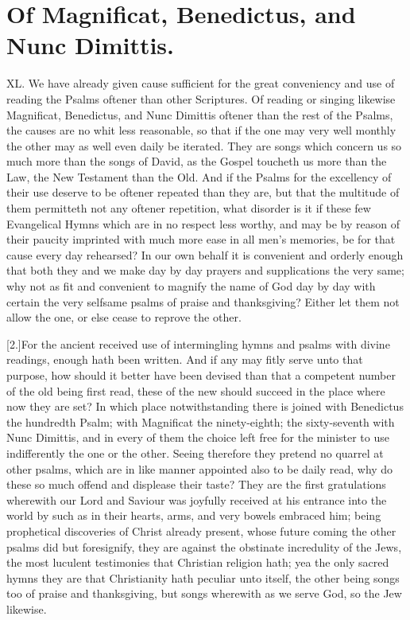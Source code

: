 \section*{Of Magnificat, Benedictus, and Nunc Dimittis.}
XL. We have already given cause sufficient for the great conveniency and use of reading the Psalms oftener than other Scriptures. Of reading or singing likewise Magnificat,  Benedictus, and Nunc Dimittis oftener than the rest of the Psalms, the causes are no whit less reasonable, so that if the one may very well monthly the other may as well even daily be iterated.
 They are songs which concern us so much more than the songs of David, as the Gospel toucheth us more than the Law, the New Testament than the Old. And if the Psalms for the excellency of their use deserve to be oftener repeated than they are, but that the multitude of them permitteth not any oftener repetition, what disorder is it if these few Evangelical Hymns which are in no respect less worthy, and may be by reason of their paucity imprinted with much more ease in all men’s memories, be for that cause every day rehearsed? In our own behalf it is convenient and orderly enough that both they and we make day by day prayers and supplications the very same; why not as fit and convenient to magnify the name of God day by day with certain the very selfsame psalms of praise and thanksgiving? Either let them not allow the one, or else cease to reprove the other.

[2.]For the ancient received use of intermingling hymns and psalms with divine readings, enough hath been written. And if any may fitly serve unto that purpose, how should it better have been devised than that a competent number of the old being first read, these of the new should succeed in the place where now they are set? In which place notwithstanding there is joined with Benedictus the hundredth Psalm; with Magnificat the ninety-eighth; the sixty-seventh with Nunc Dimittis, and in every of them the choice left free for the minister to use indifferently the one or the other. Seeing therefore they pretend no quarrel at other psalms, which are in like manner appointed also to be daily read, why do these so much offend and displease their taste? They are the first gratulations wherewith our Lord and Saviour was joyfully received at his entrance into the world by such as in their hearts, arms, and very bowels embraced him; being prophetical  discoveries of Christ already present,
 whose future coming the other psalms did but foresignify, they are against the obstinate incredulity of the Jews, the most luculent testimonies that Christian religion hath; yea the only sacred hymns they are that Christianity hath peculiar unto itself, the other being songs too of praise and thanksgiving, but songs wherewith as we serve God, so the Jew likewise.

